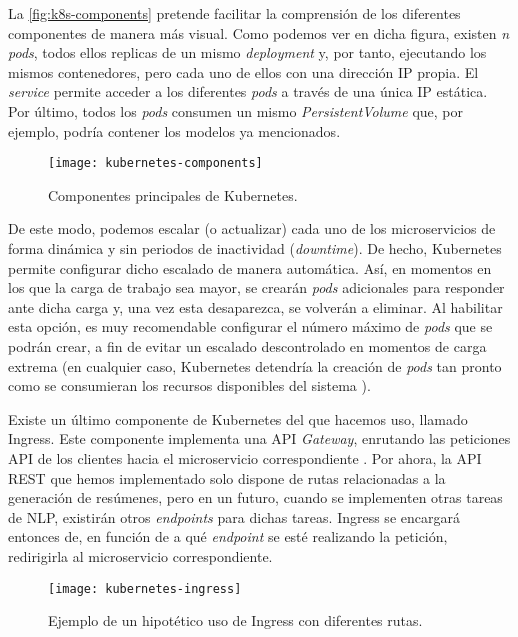 La \autoref{fig:k8s-components} pretende facilitar la comprensión de los diferentes componentes de manera más visual. Como podemos ver en dicha figura, existen \emph{n} \emph{pods}, todos ellos replicas de un mismo \emph{deployment} y, por tanto, ejecutando los mismos contenedores, pero cada uno de ellos con una dirección IP propia. El \emph{service} permite acceder a los diferentes \emph{pods} a través de una única IP estática. Por último, todos los \emph{pods} consumen un mismo \emph{PersistentVolume} que, por ejemplo, podría contener los modelos ya mencionados.

\begin{figure}[!h]
	\centering
	\texttt{[image: kubernetes-components]}
	\caption{Componentes principales de Kubernetes.}
	\label{fig:k8s-components}
\end{figure}

De este modo, podemos escalar (o actualizar) cada uno de los microservicios de forma dinámica y sin periodos de inactividad (\emph{downtime}). De hecho, Kubernetes permite configurar dicho escalado de manera automática. Así, en momentos en los que la carga de trabajo sea mayor, se crearán \emph{pods} adicionales para responder ante dicha carga y, una vez esta desaparezca, se volverán a eliminar. Al habilitar esta opción, es muy recomendable configurar el número máximo de \emph{pods} que se podrán crear, a fin de evitar un escalado descontrolado en momentos de carga extrema (en cualquier caso, Kubernetes detendría la creación de \emph{pods} tan pronto como se consumieran los recursos disponibles del sistema \cite{k8s-scheduling}).

Existe un último componente de Kubernetes del que hacemos uso, llamado Ingress. Este componente implementa una API \emph{Gateway}, enrutando las peticiones API de los clientes hacia el microservicio correspondiente \cite{api-gateway}. Por ahora, la API REST que hemos implementado solo dispone de rutas relacionadas a la generación de resúmenes, pero en un futuro, cuando se implementen otras tareas de NLP, existirán otros \emph{endpoints} para dichas tareas. Ingress se encargará entonces de, en función de a qué \emph{endpoint} se esté realizando la petición, redirigirla al microservicio correspondiente.

\begin{figure}[!h]
	\centering
	\texttt{[image: kubernetes-ingress]}
	\caption{Ejemplo de un hipotético uso de Ingress con diferentes rutas.}
	\label{fig:k8s-ingress}
\end{figure}


